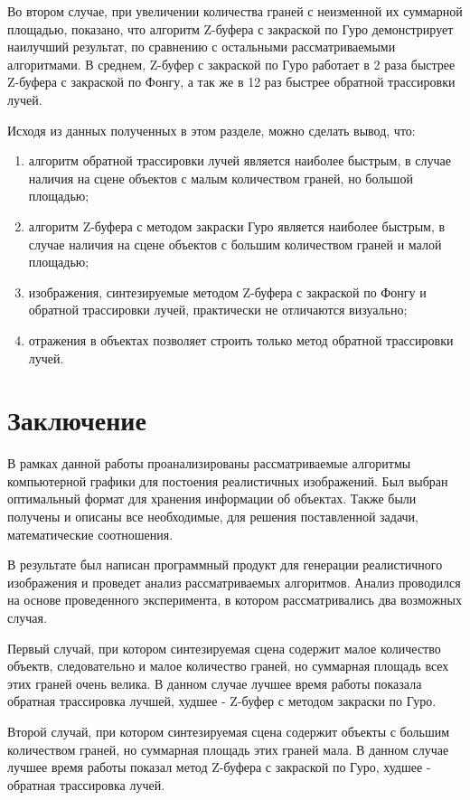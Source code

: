 \documentclass[12pt]{report}
\begin{document}
	Во втором случае, при увеличении количества граней с неизменной их суммарной площадью, показано, что алгоритм Z-буфера с закраской по Гуро демонстрирует наилучший результат, по сравнению с остальными рассматриваемыми алгоритмами. В среднем, Z-буфер с закраской по Гуро работает в 2 раза быстрее Z-буфера с закраской по Фонгу, а так же в 12 раз быстрее обратной трассировки лучей.
	
	Исходя из данных полученных в этом разделе, можно сделать вывод, что:
	\begin{enumerate}
		\item алгоритм обратной трассировки лучей является наиболее быстрым, в случае наличия на сцене объектов с малым количеством граней, но большой площадью;
		\item алгоритм Z-буфера с методом закраски Гуро является наиболее быстрым, в случае наличия на сцене объектов с большим количеством граней и малой площадью;
		\item изображения, синтезируемые методом Z-буфера с закраской по Фонгу и обратной трассировки лучей, практически не отличаются визуально;
		\item отражения в объектах позволяет строить только метод обратной трассировки лучей.
	\end{enumerate}
	
	\chapter*{Заключение}

	В рамках данной работы проанализированы рассматриваемые алгоритмы компьютерной графики для постоения реалистичных изображений. Был выбран оптимальный формат для хранения информации об объектах. Также были получены и описаны все необходимые, для решения поставленной задачи, математические соотношения.
	
	В результате был написан программный продукт для генерации реалистичного изображения и проведет анализ рассматриваемых алгоритмов. Анализ проводился на основе проведенного эксперимента, в котором рассматривались два возможных случая.
	
	Первый случай, при котором синтезируемая сцена содержит малое количество объектв, следовательно и малое количество граней, но суммарная площадь всех этих граней очень велика. В данном случае лучшее время работы показала обратная трассировка лучшей, худшее - Z-буфер с методом закраски по Гуро.
	
	Второй случай, при котором синтезируемая сцена содержит объекты с большим количеством граней, но суммарная площадь этих граней мала. В данном случае лучшее время работы показал метод Z-буфера с закраской по Гуро, худшее - обратная трассировка лучей.
	
\end{document}
